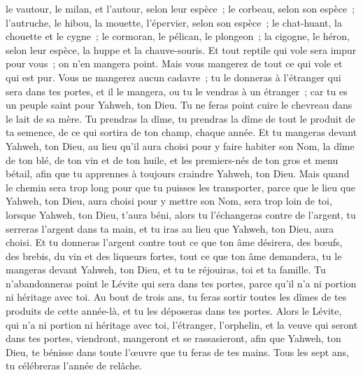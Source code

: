 \begin{multicols}{2}
le vautour, le milan, et l'autour, selon leur espèce~;
le corbeau, selon son espèce~;
l'autruche, le hibou, la mouette, l'épervier, selon son espèce~;
le chat-huant, la chouette et le cygne~;
le cormoran, le pélican, le plongeon~;
la cigogne, le héron, selon leur espèce, la huppe et la chauve-souris.
Et tout reptile qui vole sera impur pour vous~; on n'en mangera point.
Mais vous mangerez de tout ce qui vole et qui est pur.
Vous ne mangerez aucun cadavre~; tu le donneras à l'étranger qui sera dans tes portes, et il le mangera, ou tu le vendras à un étranger~; car tu es un peuple saint pour Yahweh, ton Dieu. Tu ne feras point cuire le chevreau dans le lait de sa mère.
Tu prendras la dîme, tu prendras la dîme de tout le produit de ta semence, de ce qui sortira de ton champ, chaque année.
Et tu mangeras devant Yahweh, ton Dieu, au lieu qu'il aura choisi pour y faire habiter son Nom, la dîme de ton blé, de ton vin et de ton huile, et les premiers-nés de ton gros et menu bétail, afin que tu apprennes à toujours craindre Yahweh, ton Dieu.
Mais quand le chemin sera trop long pour que tu puisses les transporter, parce que le lieu que Yahweh, ton Dieu, aura choisi pour y mettre son Nom, sera trop loin de toi, lorsque Yahweh, ton Dieu, t'aura béni,
alors tu l'échangeras contre de l'argent, tu serreras l'argent dans ta main, et tu iras au lieu que Yahweh, ton Dieu, aura choisi.
Et tu donneras l'argent contre tout ce que ton âme désirera, des bœufs, des brebis, du vin et des liqueurs fortes, tout ce que ton âme demandera, tu le mangeras devant Yahweh, ton Dieu, et tu te réjouiras, toi et ta famille.
Tu n'abandonneras point le Lévite qui sera dans tes portes, parce qu'il n'a ni portion ni héritage avec toi.
Au bout de trois ans, tu feras sortir toutes les dîmes de tes produits de cette année-là, et tu les déposeras dans tes portes.
Alors le Lévite, qui n'a ni portion ni héritage avec toi, l'étranger, l'orphelin, et la veuve qui seront dans tes portes, viendront, mangeront et se rassasieront, afin que Yahweh, ton Dieu, te bénisse dans toute l'œuvre que tu feras de tes mains.
\VerseOne{}Tous les sept ans, tu célébreras l'année de relâche.

\end{multicols}
